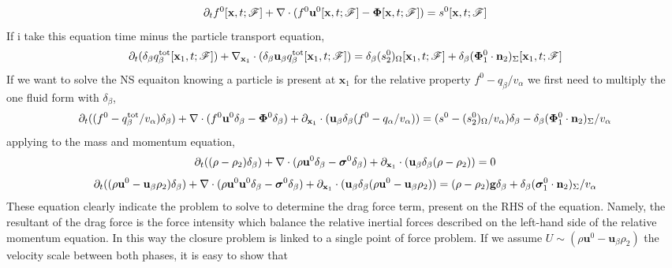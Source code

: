 \begin{equation}
    \partial_t f^0[\textbf{x},t;\mathscr{F}]
    + \mathbf{\nabla}\cdot(f^0\textbf{u}^0[\textbf{x},t;\mathscr{F}]
    - \bm\Phi[\textbf{x},t;\mathscr{F}])
    = s^0[\textbf{x},t;\mathscr{F}]
\end{equation}
If i take this equation time minus the particle transport equation, 
\begin{equation*}
    \partial_t (\delta_\beta  q_\beta^\text{tot}[\textbf{x}_1,t;\mathscr{F}])
    + \mathbf{\nabla}_{\textbf{x}_1} \cdot (\delta_\beta\textbf{u}_\beta q_\beta^\text{tot}[\textbf{x}_1,t;\mathscr{F}])
    = \delta_\beta( s_2^0 )_{\Omega}[\textbf{x}_1,t;\mathscr{F}]
    + \delta_\beta( \mathbf{\Phi}_1^0 \cdot \textbf{n}_2 )_{\Sigma}[\textbf{x}_1,t;\mathscr{F}]
\end{equation*}
If we want to solve the NS equaiton knowing a particle is present at $\textbf{x}_1$ for the relative property $f^0 -  q_\beta/v_\alpha$ we first need to multiply the one fluid form with $\delta_\beta$,  
\begin{equation}
    \partial_t ((f^0 - q_\beta^\text{tot}/v_\alpha)\delta_\beta  )
    + \mathbf{\nabla}\cdot(f^0\textbf{u}^0\delta_\beta
    - \bm\Phi^0 \delta_\beta)
    + \partial_{\textbf{x}_1}\cdot(\textbf{u}_\beta \delta_\beta (f^0 - q_\alpha/v_\alpha))
    = (s^0 - ( s_2^0 )_{\Omega}/v_\alpha)\delta_\beta 
    - \delta_\beta( \mathbf{\Phi}_1^0 \cdot \textbf{n}_2 )_{\Sigma}/v_\alpha
\end{equation}
applying to the mass and momentum equation, 
\begin{equation}
    \partial_t ((\rho  - \rho_2)\delta_\beta  )
    + \mathbf{\nabla}\cdot(\rho \textbf{u}^0\delta_\beta
    - \bm\sigma^0 \delta_\beta)
    + \partial_{\textbf{x}_1}\cdot(\textbf{u}_\beta \delta_\beta (\rho - \rho_2))
    = 0
\end{equation}
\begin{equation}
    \partial_t ((\rho \textbf{u}^0 - \textbf{u}_\beta\rho_2)\delta_\beta  )
    + \mathbf{\nabla}\cdot(\rho \textbf{u}^0\textbf{u}^0\delta_\beta
    - \bm\sigma^0 \delta_\beta)
    + \partial_{\textbf{x}_1}\cdot(\textbf{u}_\beta \delta_\beta (\rho \textbf{u}^0 - \textbf{u}_\beta\rho_2))
    = (\rho - \rho_2)\textbf{g}\delta_\beta 
    + \delta_\beta ( \bm\sigma_1^0 \cdot \textbf{n}_2 )_{\Sigma}/v_\alpha
\end{equation}
These equation clearly indicate the problem to solve to determine the drag force term, present on the RHS of the equation. 
Namely, the resultant of the drag force is the force intensity which balance the relative inertial forces described on the left-hand side of the relative momentum equation.
In this way the closure problem is linked to a single point of force problem. 
If we assume $U\sim (\rho \textbf{u}^0 - \textbf{u}_\beta\rho_2)$ the velocity scale between both phases, it is easy to show that 

